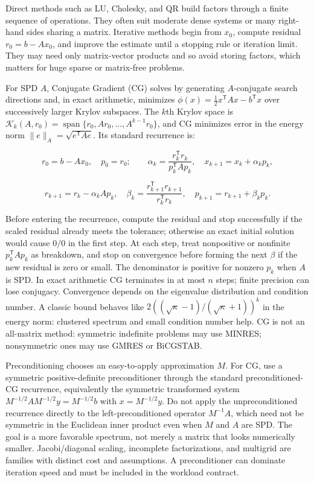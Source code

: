 \hypertarget{02-foundations-ii-ch038-direct-and-iterative-solvers-suit-different-workloads}{}

Direct methods such as LU, Cholesky, and QR build factors through a finite sequence of operations. They often suit moderate dense systems or many right-hand sides sharing a matrix. Iterative methods begin from \(x_0\), compute residual \(r_0=b-Ax_0\), and improve the estimate until a stopping rule or iteration limit. They may need only matrix-vector products and so avoid storing factors, which matters for huge sparse or matrix-free problems.

For SPD \(A\), Conjugate Gradient (CG) solves by generating \(A\)-conjugate search directions and, in exact arithmetic, minimizes \(\phi(x)=\tfrac12x^\mathsf TAx-b^\mathsf Tx\) over successively larger Krylov subspaces. The \(k\)th Krylov space is \(\mathcal K_k(A,r_0)=\operatorname{span}\{r_0,Ar_0,\ldots,A^{k-1}r_0\}\), and CG minimizes error in the energy norm \(\|e\|_A=\sqrt{e^\mathsf TAe}\). Its standard recurrence is:

\[
r_0=b-Ax_0,\quad p_0=r_0;
\qquad \alpha_k=\frac{r_k^\mathsf Tr_k}{p_k^\mathsf TAp_k},\quad
x_{k+1}=x_k+\alpha_kp_k,
\]

\[
r_{k+1}=r_k-\alpha_kAp_k,\quad
\beta_k=\frac{r_{k+1}^\mathsf Tr_{k+1}}{r_k^\mathsf Tr_k},\quad
p_{k+1}=r_{k+1}+\beta_kp_k.
\]

Before entering the recurrence, compute the residual and stop successfully if the scaled residual already meets the tolerance; otherwise an exact initial solution would cause \(0/0\) in the first step. At each step, treat nonpositive or nonfinite \(p_k^\mathsf TAp_k\) as breakdown, and stop on convergence before forming the next \(\beta\) if the new residual is zero or small. The denominator is positive for nonzero \(p_k\) when \(A\) is SPD. In exact arithmetic CG terminates in at most \(n\) steps; finite precision can lose conjugacy. Convergence depends on the eigenvalue distribution and condition number. A classic bound behaves like \(2((\sqrt\kappa-1)/(\sqrt\kappa+1))^k\) in the energy norm: clustered spectrum and small condition number help. CG is not an all-matrix method: symmetric indefinite problems may use MINRES; nonsymmetric ones may use GMRES or BiCGSTAB.

Preconditioning chooses an easy-to-apply approximation \(M\). For CG, use a symmetric positive-definite preconditioner through the standard preconditioned-CG recurrence, equivalently the symmetric transformed system \(M^{-1/2}AM^{-1/2}y=M^{-1/2}b\) with \(x=M^{-1/2}y\). Do not apply the unpreconditioned recurrence directly to the left-preconditioned operator \(M^{-1}A\), which need not be symmetric in the Euclidean inner product even when \(M\) and \(A\) are SPD. The goal is a more favorable spectrum, not merely a matrix that looks numerically smaller. Jacobi/diagonal scaling, incomplete factorizations, and multigrid are families with distinct cost and assumptions. A preconditioner can dominate iteration speed and must be included in the workload contract.

